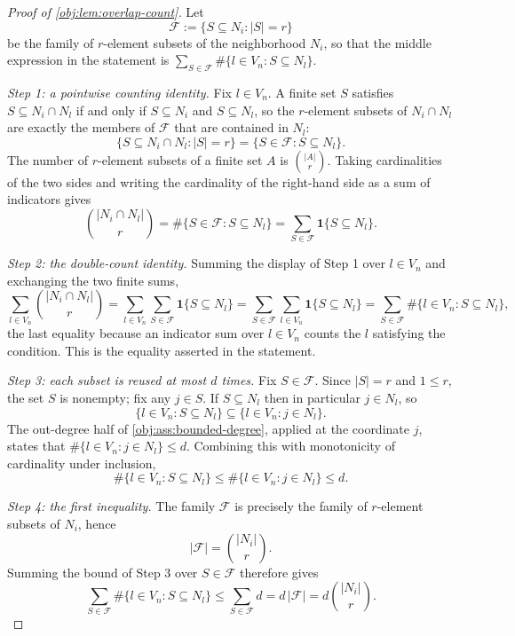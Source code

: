 \begin{proof}[Proof of \cref{obj:lem:overlap-count}]
Let
\[
\mathcal F:=\{S\subseteq N_i:|S|=r\}
\]
be the family of \(r\)-element subsets of the neighborhood \(N_i\), so that the middle expression in the statement is \(\sum_{S\in\mathcal F}\#\{l\in V_n:S\subseteq N_l\}\).

\emph{Step 1: a pointwise counting identity.}  Fix \(l\in V_n\).  A finite set \(S\) satisfies \(S\subseteq N_i\cap N_l\) if and only if \(S\subseteq N_i\) and \(S\subseteq N_l\), so the \(r\)-element subsets of \(N_i\cap N_l\) are exactly the members of \(\mathcal F\) that are contained in \(N_l\):
\[
\{S\subseteq N_i\cap N_l:|S|=r\}
=
\{S\in\mathcal F:S\subseteq N_l\}.
\]
The number of \(r\)-element subsets of a finite set \(A\) is \(\binom{|A|}{r}\).  Taking cardinalities of the two sides and writing the cardinality of the right-hand side as a sum of indicators gives
\[
\binom{|N_i\cap N_l|}{r}
=
\#\{S\in\mathcal F:S\subseteq N_l\}
=
\sum_{S\in\mathcal F}\mathbf 1\{S\subseteq N_l\}.
\]

\emph{Step 2: the double-count identity.}  Summing the display of Step 1 over \(l\in V_n\) and exchanging the two finite sums,
\[
\sum_{l\in V_n}\binom{|N_i\cap N_l|}{r}
=
\sum_{l\in V_n}\sum_{S\in\mathcal F}\mathbf 1\{S\subseteq N_l\}
=
\sum_{S\in\mathcal F}\sum_{l\in V_n}\mathbf 1\{S\subseteq N_l\}
=
\sum_{S\in\mathcal F}\#\{l\in V_n:S\subseteq N_l\},
\]
the last equality because an indicator sum over \(l\in V_n\) counts the \(l\) satisfying the condition.  This is the equality asserted in the statement.

\emph{Step 3: each subset is reused at most \(d\) times.}  Fix \(S\in\mathcal F\).  Since \(|S|=r\) and \(1\le r\), the set \(S\) is nonempty; fix any \(j\in S\).  If \(S\subseteq N_l\) then in particular \(j\in N_l\), so
\[
\{l\in V_n:S\subseteq N_l\}\subseteq\{l\in V_n:j\in N_l\}.
\]
The out-degree half of \cref{obj:ass:bounded-degree}, applied at the coordinate \(j\), states that \(\#\{l\in V_n:j\in N_l\}\le d\).  Combining this with monotonicity of cardinality under inclusion,
\[
\#\{l\in V_n:S\subseteq N_l\}
\le
\#\{l\in V_n:j\in N_l\}
\le
d .
\]

\emph{Step 4: the first inequality.}  The family \(\mathcal F\) is precisely the family of \(r\)-element subsets of \(N_i\), hence
\[
|\mathcal F|=\binom{|N_i|}{r}.
\]
Summing the bound of Step 3 over \(S\in\mathcal F\) therefore gives
\[
\sum_{S\in\mathcal F}\#\{l\in V_n:S\subseteq N_l\}
\le
\sum_{S\in\mathcal F}d
=
d\,|\mathcal F|
=
d\binom{|N_i|}{r}.
\]


\end{proof}
